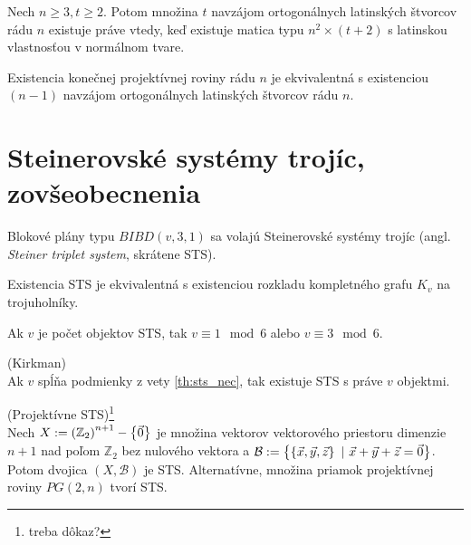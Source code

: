 \begin{theorem}
Nech $n \geq 3, t \geq 2$. Potom množina $t$ navzájom ortogonálnych latinských štvorcov rádu $n$ existuje práve vtedy,
keď existuje matica typu $n^2 \times (t+2)$ s latinskou vlastnosťou v normálnom tvare.
\end{theorem}

\begin{theorem}
Existencia konečnej projektívnej roviny rádu $n$ je ekvivalentná s existenciou $(n-1)$ navzájom ortogonálnych latinských štvorcov rádu $n$.
\end{theorem}

\begin{construction}
\TODO
\end{construction}

\section{Steinerovské systémy trojíc, zovšeobecnenia}

\begin{definition}
Blokové plány typu $BIBD(v, 3, 1)$ sa volajú Steinerovské systémy trojíc (angl. \emph{Steiner triplet system}, skrátene STS).
\end{definition}

\begin{remark}
Existencia STS je ekvivalentná s existenciou rozkladu kompletného grafu $K_v$ na trojuholníky.
\end{remark}

\begin{theorem}
\label{th:sts_nec}
Ak $v$ je počet objektov STS, tak $v \equiv 1 \mod 6$ alebo $v \equiv 3 \mod 6$.
\end{theorem}

\begin{theorem_hard}{(Kirkman)}\\
Ak $v$ spĺňa podmienky z vety \ref{th:sts_nec}, tak existuje STS s práve $v$ objektmi.
\end{theorem_hard}

\begin{theorem}{(Projektívne STS)\footnote{\TODO treba dôkaz?}}\\
Nech $X := \left(\mathbb{Z}_2\right)^{n+1} - \left\{\vec{0}\right\}$ je množina vektorov vektorového priestoru dimenzie $n+1$ nad poľom $\mathbb{Z}_2$ bez nulového vektora a 
$\mathcal{B} := \left\{\left\{\vec{x}, \vec{y}, \vec{z}\right\} ~|~ \vec{x} + \vec{y} + \vec{z} = \vec{0}\right\}$.
Potom dvojica $(X, \mathcal{B})$ je STS. Alternatívne, množina priamok projektívnej roviny $PG(2, n)$ tvorí STS.
\end{theorem}

